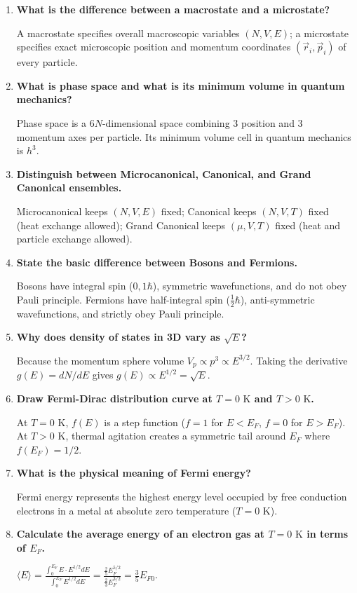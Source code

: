 \documentclass[12pt,a4paper]{article}
\newcommand{\Q}[1]{\textbf{#1}\par\noindent\ignorespaces}
\begin{document}
\begin{tcolorbox}[exambox, title={\textbf{Frequently Asked / Viva Questions}}]
\begin{enumerate}[topsep=0pt, label=\textbf{Q\arabic*.}, itemsep=5pt]
  \item \Q{What is the difference between a macrostate and a microstate?}
  A macrostate specifies overall macroscopic variables $(N,V,E)$; a microstate specifies exact microscopic position and momentum coordinates $(\vec{r}_i, \vec{p}_i)$ of every particle.

  \item \Q{What is phase space and what is its minimum volume in quantum mechanics?}
  Phase space is a $6N$-dimensional space combining 3 position and 3 momentum axes per particle. Its minimum volume cell in quantum mechanics is $h^3$.

  \item \Q{Distinguish between Microcanonical, Canonical, and Grand Canonical ensembles.}
  Microcanonical keeps $(N,V,E)$ fixed; Canonical keeps $(N,V,T)$ fixed (heat exchange allowed); Grand Canonical keeps $(\mu,V,T)$ fixed (heat and particle exchange allowed).

  \item \Q{State the basic difference between Bosons and Fermions.}
  Bosons have integral spin ($0, 1\hbar$), symmetric wavefunctions, and do not obey Pauli principle. Fermions have half-integral spin ($\frac{1}{2}\hbar$), anti-symmetric wavefunctions, and strictly obey Pauli principle.

  \item \Q{Why does density of states in 3D vary as $\sqrt{E}$?}
  Because the momentum sphere volume $V_p \propto p^3 \propto E^{3/2}$. Taking the derivative $g(E) = dN/dE$ gives $g(E) \propto E^{1/2} = \sqrt{E}$.

  \item \Q{Draw Fermi-Dirac distribution curve at $T = 0\text{ K}$ and $T > 0\text{ K}$.}
  At $T = 0\text{ K}$, $f(E)$ is a step function ($f=1$ for $E < E_F$, $f=0$ for $E > E_F$). At $T > 0\text{ K}$, thermal agitation creates a symmetric tail around $E_F$ where $f(E_F) = 1/2$.

  \item \Q{What is the physical meaning of Fermi energy?}
  Fermi energy represents the highest energy level occupied by free conduction electrons in a metal at absolute zero temperature ($T=0\text{ K}$).

  \item \Q{Calculate the average energy of an electron gas at $T = 0\text{ K}$ in terms of $E_F$.}
  $\langle E \rangle = \frac{\int_0^{E_F} E \cdot E^{1/2} dE}{\int_0^{E_F} E^{1/2} dE} = \frac{\frac{2}{5} E_F^{5/2}}{\frac{2}{3} E_F^{3/2}} = \frac{3}{5} E_{F0}$.


\end{enumerate}
\end{tcolorbox}
\end{document}

